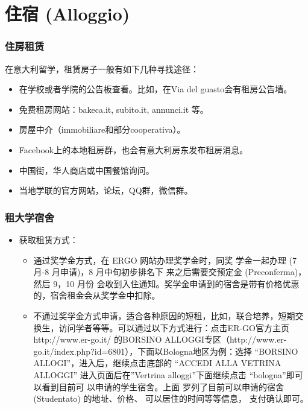 \section{住宿 (Alloggio)}
\subsubsection{住房租赁}

在意大利留学，租赁房子一般有如下几种寻找途径：



\begin{itemize} 
\item 在学校或者学院的公告板查看。比如，在Via del guasto会有租房公告墙。
\item 免费租房网站：bakeca.it, subito.it, annunci.it 等。
\item 房屋中介（immobiliare和部分cooperativa）。
\item Facebook上的本地租房群，也会有意大利房东发布租房消息。
\item 中国街，华人商店或中国餐馆询问。 
\item 当地学联的官方网站，论坛，QQ群，微信群。
\end{itemize} 
\subsubsection{租大学宿舍}
\begin{itemize}
\item 获取租赁方式：
	\begin{itemize}
		\item 通过奖学金方式，在 ERGO 网站办理奖学金时，同奖 
学金一起办理 (7 月-8 月申请)，8 月中旬初步排名下 
来之后需要交预定金 (Preconferma)，然后 9，10 月份 
会收到入住通知。奖学金申请到的宿舍是带有价格优惠 
的，宿舍租金会从奖学金中扣除。

		\item 不通过奖学金方式申请，适合各种原因的短租，比如，联合培养，短期交换生，访问学者等等。可以通过以下方式进行：点击ER-GO官方主页 http://www.er-go.it/ 的BORSINO ALLOGGI专区（http://www.er-go.it/index.php?id=6801），下面以Bologna地区为例：选择 “BORSINO ALLOGI”，进入后，继续点击底部的 
“ACCEDI ALLA VETRINA ALLOGGI”
进入页面后在”Vertrina alloggi”下面继续点击
“bologna”即可以看到目前可 以申请的学生宿舍。上面
罗列了目前可以申请的宿舍 (Studentato) 的地址、价格、
可以居住的时间等等信息， 
支付确认即可。

	\end{itemize} 
\end{itemize} 

